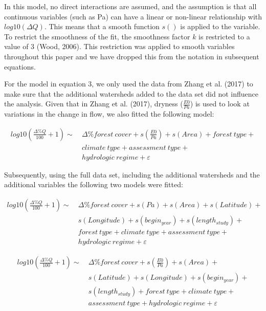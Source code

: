 \documentclass[]{elsarticle} %
\begin{document}
In this model, no direct interactions are assumed, and the assumption is
that all continuous variables (such as Pa) can have a linear or
non-linear relationship with \(log10(\Delta Q)\). This means that a
smooth function \(s()\) is applied to the variable. To restrict the
smoothness of the fit, the smoothness factor \(k\) is restricted to a
value of 3 (Wood, 2006). This restriction was applied to smooth
variables throughout this paper and we have dropped this from the
notation in subsequent equations.

For the model in equation 3, we only used the data from Zhang et al.
(2017) to make sure that the additional watersheds added to the data set
did not influence the analysis. Given that in Zhang et al. (2017),
dryness (\(\frac{E0}{Pa}\)) is used to look at variations in the change
in flow, we also fitted the following model:

\[\tag{4}
\begin{aligned}
log10(\frac{\Delta \% Q}{100} + 1) \sim ~&\Delta \% forest~cover + s(\frac{E0}{Pa}) + s(Area) +  {forest~type} + 
\\  &{climate~type} + {assessment~type} + \\  &{hydrologic~regime} + \varepsilon
\end{aligned}\]

Subsequently, using the full data set, including the additional
watersheds and the additional variables the following two models were
fitted:

\[\tag{5}
\begin{aligned}
log10(\frac{\Delta \% Q}{100} + 1) \sim ~&\Delta \% forest~cover + s(Pa) + s(Area) + s(Latitude) + \\
& s(Longitude) + s(begin_{year}) + s(length_{study}) +\\
&{forest~type} + {climate~type} + {assessment~type} +\\
& {hydrologic~regime} + \varepsilon
\end{aligned}\]

\[\tag{6}
\begin{aligned}
log10(\frac{\Delta \% Q}{100} + 1) \sim ~&\Delta \% forest~cover +
s(\frac{E0}{Pa}) + s(Area) + \\ 
& s(Latitude) + s(Longitude) + s(begin_{year}) + \\ 
& s(length_{study}) + {forest~type} + {climate~type} + \\ 
& {assessment~type} + {hydrologic~regime} + \varepsilon
\end{aligned}\]
\end{document}
